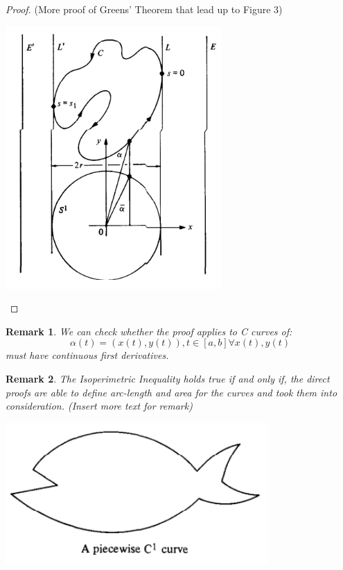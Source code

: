 \documentclass[a4paper]{book}
\newtheorem{remark}{Remark}%
\begin{document}
\begin{proof}
    (More proof of Greens' Theorem that lead up to Figure 3)
    \begin{center}
      \includegraphics[height=100mm]{Proof 1 Figure.png}
    \end{center}
\end{proof}

\begin{remark}
    We can check whether the proof applies to C curves of: 
    \[\alpha(t)=(x(t),y(t)), t\in [a,b] \forall x(t),y(t) \] must have continuous first derivatives.~\cite{do2016differential}
\end{remark}

\begin{remark}
    The Isoperimetric Inequality holds true if and only if, the direct proofs are able to define arc-length and area for the curves and took them into consideration. (Insert more text for remark) ~\cite{do2016differential}
\end{remark}

\begin{center}
  \includegraphics[width=100mm]{2nd Remark Figure.png}
\end{center}
\end{document}
